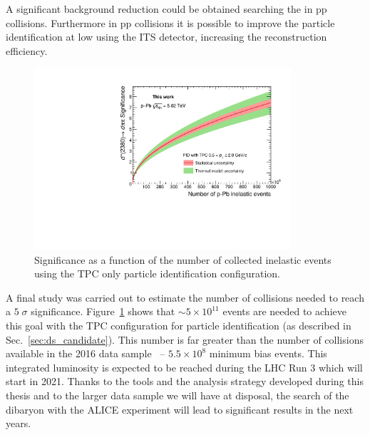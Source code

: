 A significant background reduction could be obtained searching the \ds in pp collisions.
Furthermore in pp collisions it is possible to improve the particle identification at low \pt
using the ITS detector, increasing the reconstruction efficiency.

\begin{figure} [htb]
    \centering
    \includegraphics[width=0.85\textwidth]{gfx/sig_TPC}
    \caption{Significance as a function of the number of collected \pPb inelastic events using the TPC only particle identification configuration.}
	\label{fig:proj1}
\end{figure}

A final study was carried out to estimate the number of \pPb collisions needed to reach a
$5\;\sigma$ significance.
Figure~\ref{fig:proj1} shows that $\sim 5\times10^{11}$ events are needed to achieve this goal 
with the TPC configuration for particle identification (as described in Sec.~\ref{sec:ds_candidate}).
This number is far greater than the number of \pPb collisions available in the 2016 data sample
\ -- $5.5\times10^{8}$ minimum bias events.
This integrated luminosity is expected to be reached during the LHC Run 3 which will start in 2021.
Thanks to the tools and the analysis strategy developed during this thesis and to the larger data sample we will have at disposal, the search of the \ds dibaryon with the ALICE experiment will lead to significant results in the next years.
